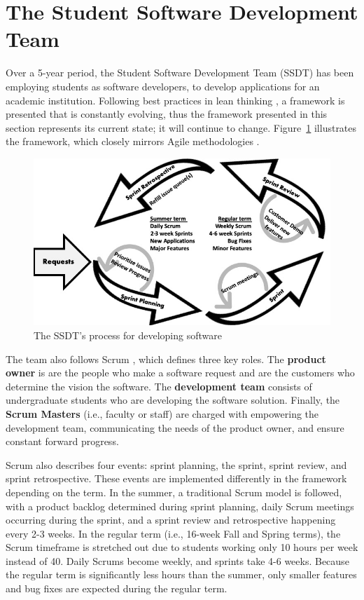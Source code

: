 \section{The Student Software Development Team}
Over a 5-year period, the Student Software Development Team (SSDT) has been employing students as software developers, to develop applications for an academic institution. Following best practices in lean thinking \cite{lean}, a framework is presented that is constantly evolving, thus the framework presented in this section represents its current state; it will continue to change. Figure~\ref{fig:framework} illustrates the framework, which closely mirrors Agile methodologies \cite{agilemanifesto}.

\begin{figure}[htbp]
 \centering
 \includegraphics[width=\linewidth]{developmentcycle4.jpg}
 \caption{The SSDT's process for developing software}
 \label{fig:framework}
\end{figure}

The team also follows Scrum \cite{thescrumguide}, which defines three key roles. The \textbf{product owner} is are the people who make a software request and are the customers who determine the vision the software. The \textbf{development team} consists of undergraduate students who are developing the software solution. Finally, the \textbf{Scrum Masters} (i.e., faculty or staff) are charged with empowering the development team, communicating the needs of the product owner, and ensure constant forward progress.

Scrum also describes four events: sprint planning, the sprint, sprint review, and sprint retrospective. These events are implemented differently in the framework depending on the term. In the summer, a traditional Scrum model is followed, with a product backlog determined during sprint planning, daily Scrum meetings occurring during the sprint, and a sprint review and retrospective happening every 2-3 weeks. In the regular term (i.e., 16-week Fall and Spring terms), the Scrum timeframe is stretched out due to students working only 10 hours per week instead of 40. Daily Scrums become weekly, and sprints take 4-6 weeks. Because the regular term is significantly less hours than the summer, only smaller features and bug fixes are expected during the regular term.

